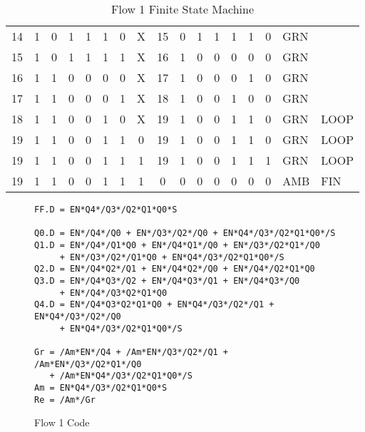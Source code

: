 \begin{table*}
\begin{tabularx}{\linewidth}{ c c c c c c c c | c c c c c c | c l l}
   14 &   1 &  0 &  1 &  1 &  1 &  0 & X      &  15 &  0 &  1 &  1 &  1 &  1             &   0 & GRN & \\
   15 &   1 &  0 &  1 &  1 &  1 &  1 & X      &  16 &  1 &  0 &  0 &  0 &  0             &   0 & GRN & \\
   16 &   1 &  1 &  0 &  0 &  0 &  0 & X      &  17 &  1 &  0 &  0 &  0 &  1             &   0 & GRN & \\
   17 &   1 &  1 &  0 &  0 &  0 &  1 & X      &  18 &  1 &  0 &  0 &  1 &  0             &   0 & GRN & \\
   18 &   1 &  1 &  0 &  0 &  1 &  0 & X      &  19 &  1 &  0 &  0 &  1 &  1             &   0 & GRN & LOOP \\
   19 &   1 &  1 &  0 &  0 &  1 &  1 & 0      &  19 &  1 &  0 &  0 &  1 &  1             &   0 & GRN & LOOP \\
   19 &   1 &  1 &  0 &  0 &  1 &  1 & 1      &  19 &  1 &  0 &  0 &  1 &  1             &   1 & GRN & LOOP \\
   19 &   1 &  1 &  0 &  0 &  1 &  1 & 1      &   0 &  0 &  0 &  0 &  0 &  0             &   0 & AMB & FIN
\end{tabularx}
\caption{Flow 1 Finite State Machine}
\label{tab:F1sm}
\end{table*}

\begin{figure*}
\begin{lstlisting}
FF.D = EN*Q4*/Q3*/Q2*Q1*Q0*S

Q0.D = EN*/Q4*/Q0 + EN*/Q3*/Q2*/Q0 + EN*Q4*/Q3*/Q2*Q1*Q0*/S
Q1.D = EN*/Q4*/Q1*Q0 + EN*/Q4*Q1*/Q0 + EN*/Q3*/Q2*Q1*/Q0
     + EN*/Q3*/Q2*/Q1*Q0 + EN*Q4*/Q3*/Q2*Q1*Q0*/S
Q2.D = EN*/Q4*Q2*/Q1 + EN*/Q4*Q2*/Q0 + EN*/Q4*/Q2*Q1*Q0
Q3.D = EN*/Q4*Q3*/Q2 + EN*/Q4*Q3*/Q1 + EN*/Q4*Q3*/Q0
     + EN*/Q4*/Q3*Q2*Q1*Q0
Q4.D = EN*/Q4*Q3*Q2*Q1*Q0 + EN*Q4*/Q3*/Q2*/Q1 + EN*Q4*/Q3*/Q2*/Q0
     + EN*Q4*/Q3*/Q2*Q1*Q0*/S

Gr = /Am*EN*/Q4 + /Am*EN*/Q3*/Q2*/Q1 + /Am*EN*/Q3*/Q2*Q1*/Q0
   + /Am*EN*Q4*/Q3*/Q2*Q1*Q0*/S
Am = EN*Q4*/Q3*/Q2*Q1*Q0*S
Re = /Am*/Gr
\end{lstlisting}
\caption{Flow 1 Code}
\label{lst:F1}
\end{figure*}


